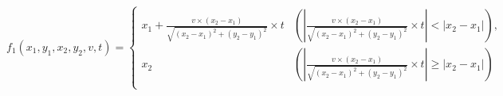 $$
f_1(x_1,y_1,x_2,y_2,v, t) = \begin{cases}
x_1 + \frac{v \times (x_2-x_1)}{\sqrt{(x_2-x_1)^2+(y_2-y_1)^2}} \times t &{(\left|  \frac{v \times (x_2-x_1)}{\sqrt{(x_2-x_1)^2+(y_2-y_1)^2}} \times t \right| < \left|x_2 - x_1\right|)},\\
x_2 &{(\left|  \frac{v \times (x_2-x_1)}{\sqrt{(x_2-x_1)^2+(y_2-y_1)^2}} \times t \right| \geq \left|x_2 - x_1\right|)}\\
\end{cases}
$$